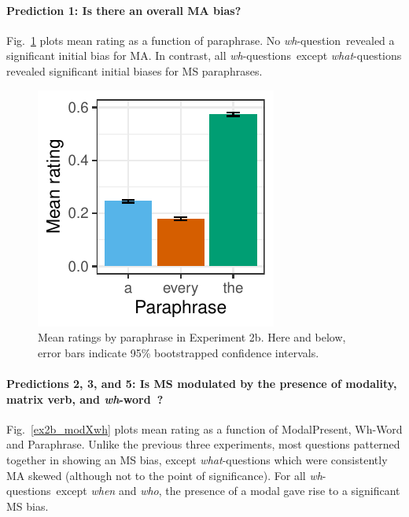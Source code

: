 \documentclass[12pt,letterpaper,table,svgnames,dvipsnames]{article}
\newcommand{\figref}[1]{Fig.~\ref{#1}}
\newcommand{\whq}{\emph{wh}-question~}
\newcommand{\whqs}{\emph{wh}-questions~}
\newcommand{\whw}{\emph{wh}-word~}
\begin{document}
\paragraph{Prediction 1: Is there an overall MA bias?}
\figref{ex2b_overall} plots mean rating as a function of paraphrase. No \whq revealed a significant initial bias for MA. In contrast, all \whqs except \emph{what}-questions revealed significant initial biases for MS paraphrases. 

\begin{figure}[h!]
\centering
\centering
\includegraphics[scale=1]{figures/overall_nocontext_embedded.pdf}
\caption{Mean ratings by paraphrase in Experiment 2b. Here and below, error bars indicate 95\% bootstrapped confidence intervals.}
\label{ex2b_overall}
\end{figure}


\paragraph{Predictions 2, 3, and 5: Is MS modulated by the presence of modality, matrix verb, and \whw?}
\figref{ex2b_modXwh} plots mean rating as a function of ModalPresent, Wh-Word and Paraphrase. Unlike the previous three experiments, most questions patterned together in showing an MS bias, except \emph{what}-questions which were consistently MA skewed (although not to the point of significance). For all \whqs except \emph{when} and \emph{who}, the presence of a modal gave rise to a significant MS bias. 
\end{document}
